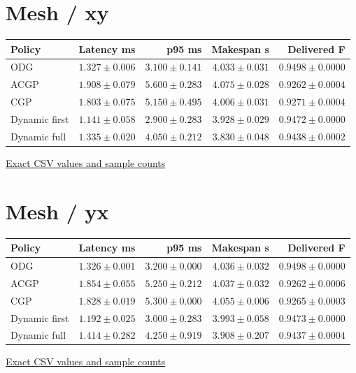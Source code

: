 \section*{Mesh / xy}
\begin{center}{\scriptsize\setlength{\tabcolsep}{3pt}
\begin{tabular}{lrrrr}
\toprule
Policy & Latency ms & p95 ms & Makespan s & Delivered F \\
\midrule
ODG & $1.327\pm0.006$ & $3.100\pm0.141$ & $4.033\pm0.031$ & $0.9498\pm0.0000$ \\
ACGP & $1.908\pm0.079$ & $5.600\pm0.283$ & $4.075\pm0.028$ & $0.9262\pm0.0004$ \\
CGP & $1.803\pm0.075$ & $5.150\pm0.495$ & $4.006\pm0.031$ & $0.9271\pm0.0004$ \\
Dynamic first & $1.141\pm0.058$ & $2.900\pm0.283$ & $3.928\pm0.029$ & $0.9472\pm0.0000$ \\
Dynamic full & $1.335\pm0.020$ & $4.050\pm0.212$ & $3.830\pm0.048$ & $0.9438\pm0.0002$ \\
\bottomrule\end{tabular}}
{\footnotesize\href{https://github.com/sanjeevkrishnaa/Compiler-Driven-ACE/blob/codex/ace-scheduler-correctness/docs/latex/qft96_final/data/matched_m4_c3.csv}{Exact CSV values and sample counts}}
\end{center}
\section*{Mesh / yx}
\begin{center}{\scriptsize\setlength{\tabcolsep}{3pt}
\begin{tabular}{lrrrr}
\toprule
Policy & Latency ms & p95 ms & Makespan s & Delivered F \\
\midrule
ODG & $1.326\pm0.001$ & $3.200\pm0.000$ & $4.036\pm0.032$ & $0.9498\pm0.0000$ \\
ACGP & $1.854\pm0.055$ & $5.250\pm0.212$ & $4.037\pm0.032$ & $0.9262\pm0.0006$ \\
CGP & $1.828\pm0.019$ & $5.300\pm0.000$ & $4.055\pm0.006$ & $0.9265\pm0.0003$ \\
Dynamic first & $1.192\pm0.025$ & $3.000\pm0.283$ & $3.993\pm0.058$ & $0.9473\pm0.0000$ \\
Dynamic full & $1.414\pm0.282$ & $4.250\pm0.919$ & $3.908\pm0.207$ & $0.9437\pm0.0004$ \\
\bottomrule\end{tabular}}
{\footnotesize\href{https://github.com/sanjeevkrishnaa/Compiler-Driven-ACE/blob/codex/ace-scheduler-correctness/docs/latex/qft96_final/data/matched_m4_c3.csv}{Exact CSV values and sample counts}}
\end{center}
